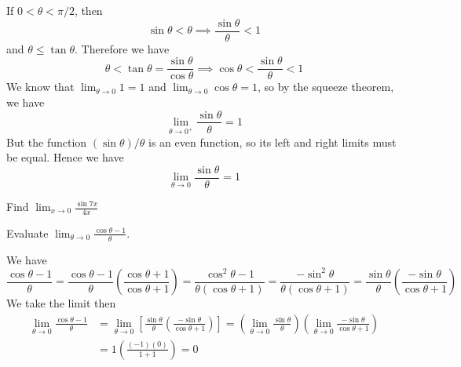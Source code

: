 If \(0<\theta<\pi/2\),
then \[\sin\theta<\theta\implies\frac{\sin\theta}{\theta}<1\]
and \(\theta\leq\tan\theta\).
Therefore we have
\[\theta<\tan\theta=\frac{\sin\theta}{\cos\theta}
\implies\cos\theta<\frac{\sin\theta}{\theta}<1\]
We know that \(\displaystyle{\lim_{\theta\to 0}1=1}\) and
\(\displaystyle{\lim_{\theta\to 0}\cos\theta=1}\),
so by the squeeze theorem,
we have
\[\lim_{\theta\to 0^+}\frac{\sin\theta}{\theta}=1\]
But the function \((\sin\theta)/\theta\) is an even function,
so its left and right limits must be equal.
Hence we have
\[\lim_{\theta\to 0}\frac{\sin\theta}{\theta}=1\]
\begin{problem}
    Find \(\displaystyle{\lim_{x\to 0}\frac{\sin 7x}{4x}}\)
\end{problem}
\begin{problem}
    Evaluate \(\displaystyle{\lim_{\theta\to 0}\frac{\cos\theta-1}{\theta}}\).
\end{problem}
\begin{solution}
    We have
    \[\frac{\cos\theta-1}{\theta}
    =\frac{\cos\theta-1}{\theta}\left(\frac{\cos\theta+1}{\cos\theta+1}\right)
    =\frac{\cos^2\theta-1}{\theta(\cos\theta+1)}
    =\frac{-\sin^2\theta}{\theta(\cos\theta+1)}
    =\frac{\sin\theta}{\theta}\left(\frac{-\sin\theta}{\cos\theta+1}\right)\]
    We take the limit then
    \begin{align*}
        \lim_{\theta\to 0}\frac{\cos\theta-1}{\theta}
        &= \lim_{\theta\to 0}\left[\frac{\sin\theta}{\theta}
        \left(\frac{-\sin\theta}{\cos\theta+1}\right)\right]
        =\left(\lim_{\theta\to 0}\frac{\sin\theta}{\theta}\right)
        \left(\lim_{\theta\to 0}\frac{-\sin\theta}{\cos\theta+1}\right) \\
        &= 1\left(\frac{(-1)(0)}{1+1}\right)=0 
    \end{align*}
\end{solution}